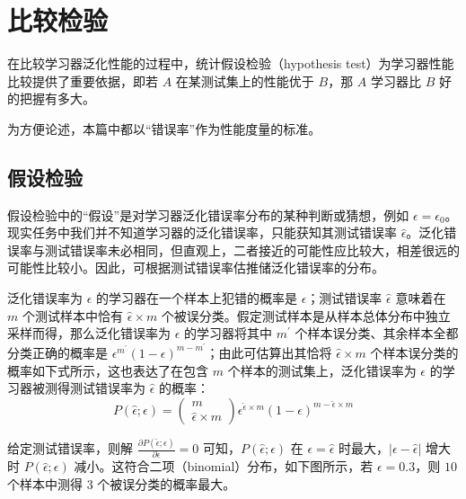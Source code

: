 \documentclass[12pt, a4paper]{article} %
\begin{document}
\section{比较检验}

在比较学习器泛化性能的过程中，统计假设检验（hypothesis test）为学习器性能比较提供了重要依据，即若 $A$ 在某测试集上的性能优于 $B$，那 $A$ 学习器比 $B$ 好的把握有多大。

为方便论述，本篇中都以“错误率”作为性能度量的标准。

\subsection{假设检验}

假设检验中的“假设”是对学习器泛化错误率分布的某种判断或猜想，例如 $\epsilon = \epsilon_0$。现实任务中我们并不知道学习器的泛化错误率，只能获知其测试错误率 $\hat{\epsilon}$。泛化错误率与测试错误率未必相同，但直观上，二者接近的可能性应比较大，相差很远的可能性比较小。因此，可根据测试错误率估推储泛化错误率的分布。

泛化错误率为 $\epsilon$ 的学习器在一个样本上犯错的概率是 $\epsilon$；测试错误率 $\hat{\epsilon}$ 意味着在 $m$ 个测试样本中恰有 $\hat{\epsilon} \times m$ 个被误分类。假定测试样本是从样本总体分布中独立采样而得，那么泛化错误率为 $\epsilon$ 的学习器将其中 $m^\prime$ 个样本误分类、其余样本全都分类正确的概率是 $\epsilon^{m^\prime} (1 - \epsilon)^{m - m^\prime}$；由此可估算出其恰将 $\hat{\epsilon} \times m$ 个样本误分类的概率如下式所示，这也表达了在包含 $m$ 个样本的测试集上，泛化错误率为 $\epsilon$ 的学习器被测得测试错误率为 $\hat{\epsilon}$ 的概率：
\begin{equation*}
    P(\hat{\epsilon}; \epsilon) = \left( {\begin{array}{*{20}{c}}
        m\\
        {\hat{\epsilon} \times m}
        \end{array}} \right) \epsilon^{\hat{\epsilon} \times m} (1 - \epsilon) ^{m - \hat{\epsilon} \times m}
\end{equation*}

给定测试错误率，则解 $\displaystyle \frac{\partial P (\hat{\epsilon}; \epsilon)}{\partial \epsilon} = 0$ 可知，$P (\hat{\epsilon}; \epsilon)$ 在 $\epsilon = \hat{\epsilon}$ 时最大，$|\epsilon - \hat{\epsilon}|$ 增大时 $P (\hat{\epsilon}; \epsilon)$ 减小。这符合二项（binomial）分布，如下图所示，若 $\epsilon = 0.3$，则 $10$ 个样本中测得 $3$ 个被误分类的概率最大。
\end{document}
